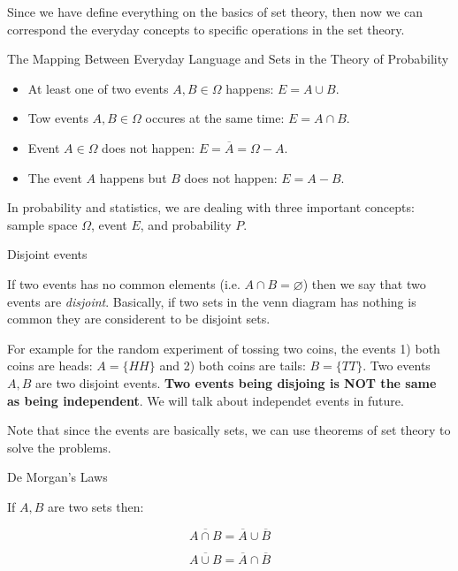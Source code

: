 Since we have define everything on the basics of set theory, then now we can correspond the everyday concepts to specific operations in the set theory.

\begin{example}{The Mapping Between Everyday Language and Sets in the Theory of Probability}

\begin{itemize}
\item At least one of two events $A,B \in \Omega$ happens: $E = A \cup B$.
\item Tow events $A,B \in \Omega$ occures at the same time: $E = A \cap B$.
\item Event $A \in \Omega$ does not happen: $E = \overline{A} = \Omega - A$.
\item The event $A$ happens but $B$ does not happen: $E = A - B$.

\end{itemize}

\end{example}



In probability and statistics, we are dealing with three important concepts: sample space $\Omega$, event $E$, and probability $P$.


\begin{defbox}{Disjoint events}

If two events has no common elements (i.e. $A \cap B = \varnothing$) then we say that two events are \emph{disjoint}. Basically, if two sets in the venn diagram has nothing is common they are considerent to be disjoint sets.


For example for the random experiment of tossing two coins, the events 1) both coins are heads: $A = \{HH\}$ and 2) both coins are tails: $B = \{TT\}$. Two events $A,B$  are two disjoint events. \textbf{Two events being  disjoing is NOT the same as being independent}. We will talk about independet events in future.

\end{defbox}

Note that since the events are basically sets, we can use theorems of set theory to solve the problems. 

\begin{thmbox}{De Morgan's Laws}

If $A,B$ are two sets then:

$$\overline{A \cap B} = \overline{A} \cup \overline{B}$$

$$\overline{A \cup B} = \overline{A} \cap \overline{B}$$

\end{thmbox}

